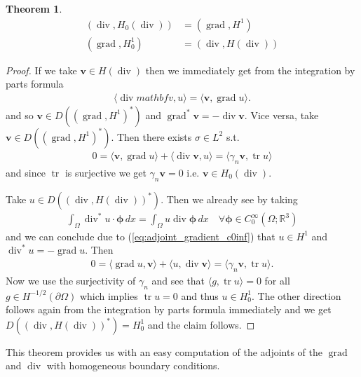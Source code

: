 \documentclass[12pt,a4paper]{article}
\numberwithin{equation}{subsection}
\numberwithin{lemma}{subsection}
\newtheorem{theorem}[lemma]{Theorem}
\theoremstyle{definition}
\DeclareMathOperator{\diver}{div}
\DeclareMathOperator{\grad}{grad}
\DeclareMathOperator{\tr}{tr}
\newcommand{\real}{\mathbb{R}}
\begin{document}
\begin{theorem}\label{thm:adjoints_grad_div_without_bc}
    \begin{align}
        (\diver, H_0(\diver)) &= (\grad, H^1) \\
        (\grad, H_0^1) &= (\diver, H(\diver))
    \end{align}
\end{theorem}
\begin{proof}
    If we take $\mathbf{v} \in H(\diver)$ then we immediately get 
    from the integration by parts formula
    \begin{align*}
        \langle \diver mathbf{v}, u \rangle = \langle \mathbf{v}, \grad u \rangle.
    \end{align*}
    and so $\mathbf{v} \in D((\grad, H^1)^*)$ and $\grad^* \mathbf{v} = -\diver \mathbf{v}$.
    Vice versa, take $\mathbf{v} \in D((\grad, H^1)^*)$. Then there exists 
    $\sigma \in L^2$ s.t.
    \begin{align*}
        0 = \langle \mathbf{v}, \grad u \rangle + \langle \diver \mathbf{v}, u \rangle
        = \langle \gamma_n \mathbf{v}, \tr u \rangle
    \end{align*}
    and since $\tr$ is surjective we get $\gamma_n \mathbf{v} = 0$ i.e. 
    $\mathbf{v} \in H_0(\diver)$.

    Take $u \in D((\diver, H(\diver))^*)$. Then we already see by taking 
    \begin{align*}
        \int_\Omega \diver^*u \cdot \mathbf{\phi} \, dx
        = \int_\Omega u \diver \mathbf{\phi} \, dx \quad \forall \mathbf{\phi} \in C_0^\infty(\Omega;\real^3)
    \end{align*}
    and we can conclude due to (\ref{eq:adjoint_gradient_c0inf}) that $u \in H^1$ and
    $\diver^*u = -\grad u$. Then 
    \begin{align*}
        0 = \langle \grad u, \mathbf{v} \rangle
            + \langle u, \diver \mathbf{v} \rangle
        = \langle \gamma_n \mathbf{v}, \tr u \rangle.
    \end{align*}
    Now we use the surjectivity of $\gamma_n$ and see that 
    $\langle g, \tr u \rangle = 0$ for all $g \in H^{-1/2}(\partial \Omega)$ which 
    implies $\tr u = 0$ and thus $u \in H^1_0$. The other direction follows again 
    from the integration by parts formula immediately and we get 
    $D((\diver, H(\diver))^*) = H^1_0$ and the claim follows.
\end{proof}
This theorem provides us with an easy computation of the adjoints 
of the $\grad$ and $\diver$ with homogeneous boundary conditions.
\end{document}
